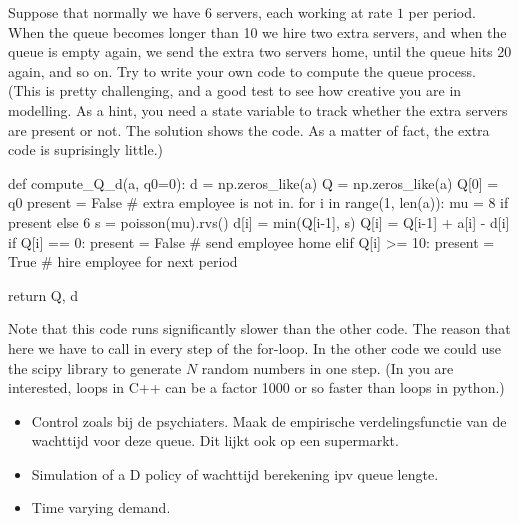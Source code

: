 \documentclass{scrartcl}
\begin{document}
\begin{exercise}
  Suppose that normally we have 6 servers, each working at rate $1$ per period. When the queue becomes longer than 10 we hire two extra servers, and when the queue is empty again, we send the extra two servers home, until the queue hits 20 again, and so on. Try to write your own code to compute the queue process. (This is pretty challenging, and a good test to see how creative you are in modelling. As a hint, you need a state variable to track whether the extra servers are present or not. The solution shows the code. As a matter of fact, the extra code is suprisingly little.)
  

  \begin{solution}
    \begin{pyblock}
def compute_Q_d(a, q0=0):
    d = np.zeros_like(a)
    Q = np.zeros_like(a)
    Q[0] = q0
    present = False # extra employee is not in.
    for i in range(1, len(a)):
        mu = 8 if present else 6
        s = poisson(mu).rvs()
        d[i] = min(Q[i-1], s)
        Q[i] = Q[i-1] + a[i] - d[i]
        if Q[i] == 0:
            present = False # send employee home
        elif Q[i] >= 10:
            present = True # hire employee for next period

    return Q, d
    
    \end{pyblock}

Note that this code runs significantly slower than the other code. The reason that here we have to call  in every step of the for-loop. In the other code we could use the scipy library to generate $N$ random numbers in one step. (In you are interested, loops in C++ can be a factor 1000 or so faster than loops in python.)
  \end{solution}
  
\end{exercise}



\begin{itemize}
\item Control zoals bij de psychiaters. Maak de empirische verdelingsfunctie van de wachttijd voor deze queue. Dit lijkt ook op een supermarkt. 
\item Simulation of a D policy of wachttijd berekening ipv queue lengte.
\item Time varying demand.
\end{itemize}
\end{document}
